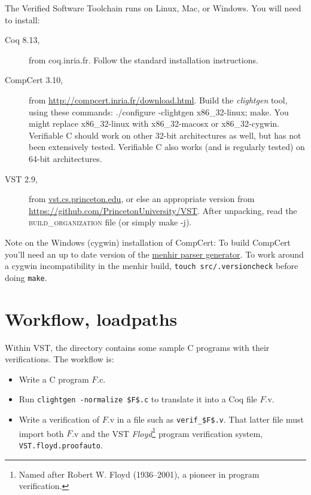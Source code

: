 \documentclass[12pt,fleqn,openany,oneside,showtrims]{memoir}
\newcommand\vstversion{2.9}
\newcommand\coqversion{8.13}
\newcommand\compcertversion{3.10}
\begin{document}
The Verified Software Toolchain runs on Linux, Mac, or Windows.
You will need to install:

\begin{description}
\item[Coq \coqversion{},] from coq.inria.fr.  Follow the standard installation instructions.
\item[CompCert \compcertversion{},] from \href{http://compcert.inria.fr/download.html}{http://compcert.inria.fr/download.html}.
  Build the \emph{clightgen} tool, using these commands:
  \textsf{./configure -clightgen x86\_32-linux; make}.  You might replace
  x86\_32-linux with x86\_32-macosx or x86\_32-cygwin.  Verifiable C should work
  on other 32-bit architectures as well, but has not been extensively tested.
  Verifiable C also works (and is regularly tested) on 64-bit architectures.
\item[VST \vstversion{},] from \href{vst.cs.princeton.edu}{vst.cs.princeton.edu},
  or else an appropriate
  version from \href{https://github.com/PrincetonUniversity/VST}{https://github.com/PrincetonUniversity/VST}.
  After unpacking, read the \textsc{build\_organization} file
  (or simply \textsf{make -j}).
\end{description}

{\small
  Note on the Windows (cygwin) installation of CompCert:
  To build CompCert you'll need an up to date version of the
  \href{http://gallium.inria.fr/~fpottier/menhir/}{menhir parser generator}.
  To work around a cygwin incompatibility in the menhir build,
  \lstinline{touch src/.versioncheck} before doing \lstinline{make}.}

\chapter{Workflow, loadpaths}
\label{refman:workflow}
Within VST, the  directory contains some sample C programs
with their verifications.  The workflow is:
\begin{itemize}
\item Write a C program $F$.c.
\item Run \lstinline{clightgen -normalize $F$.c} to translate it into a Coq
file $F$.v.
\item Write a verification of $F$.v in a file such as
\lstinline{verif_$F$.v}.  That latter file must import
both $F$.v and the VST \emph{Floyd}\footnote{Named after Robert W. Floyd (1936--2001), a pioneer in program verification.} program verification system,
\lstinline{VST.floyd.proofauto}.
\end{itemize}
\end{document}
